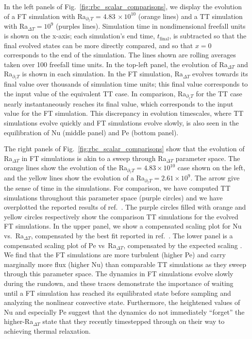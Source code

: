 \documentclass[aps, pre, onecolumn, nofootinbib, notitlepage, groupedaddress, amsfonts, amssymb, amsmath, longbibliography, superscriptaddress]{revtex4-1}
\begin{document}
In the left panels of Fig.~\ref{fig:rbc_scalar_comparisons}, we display the evolution of a FT simulation with Ra$_{\partial_z T}$ = 4.83$\,\times 10^{10}$ (orange lines) and a TT simulation with Ra$_{\Delta T} = 10^9$ (purples lines).
Simulation time in nondimensional freefall units is shown on the x-axis; each simulation's end time, $t_{\text{final}}$, is subtracted so that the final evolved states can be more directly compared, and so that $x = 0$ corresponds to the end of the simulation.
The lines shown are rolling averages taken over 100 freefall time units.
In the top-left panel, the evolution of Ra$_{\Delta T}$ and Ra$_{\partial_z T}$ is shown in each simulation.
In the FT simulation, Ra$_{\Delta T}$ evolves towards its final value over thousands of simulation time units; this final value corresponds to the input value of the equivalent TT case.
In comparison, Ra$_{\partial_z T}$ for the TT case nearly instantaneously reaches its final value, which corresponds to the input value for the FT simulation.
This discrepancy in evolution timescales, where TT simulations evolve quickly and FT simulations evolve slowly, is also seen in the equilibration of Nu (middle panel) and Pe (bottom panel).

The right panels of Fig.~\ref{fig:rbc_scalar_comparisons} show that the evolution of Ra$_{\Delta T}$ in FT simulations is akin to a sweep through Ra$_{\Delta T}$ parameter space.
The orange lines show the evolution of the Ra$_{\partial_z T} = 4.83 \times 10^{10}$ case shown on the left, and the yellow lines show the evolution of a Ra$_{\partial_z T} = 2.61 \times 10^{9}$.
The arrow give the sense of time in the simulations.
For comparison, we have computed TT simulations throughout this parameter space (purple circles) and we have overplotted the reported results of ref.~\cite{zhu&all2018}.
The purple circles filled with orange and yellow circles respectively show the comparison TT simulations for the evolved FT simulations.
In the upper panel, we show a compensated scaling plot for Nu vs.~Ra$_{\Delta T}$, compensated by the best fit reported in ref.~\cite{johnston&doering2009}.
The lower panel is a compensated scaling plot of Pe vs~Ra$_{\Delta T}$, compensated by the expected scaling \cite{ahlers&all2009}.
We find that the FT simulations are more turbulent (higher Pe) and carry marginally more flux (higher Nu) than comparable TT simulations as they sweep through this parameter space.
The dynamics in FT simulations evolve slowly during the rundown, and these traces demonstrate the importance of waiting until a FT simulation has reached its equilibrated state before sampling and analyzing the nonlinear convective state.
Furthermore, the heightened values of Nu and especially Pe suggest that the dynamics do not immediately ``forget'' the higher-Ra$_{\Delta T}$ state that they recently timestepped through on their way to achieving thermal relaxation.
\end{document}
